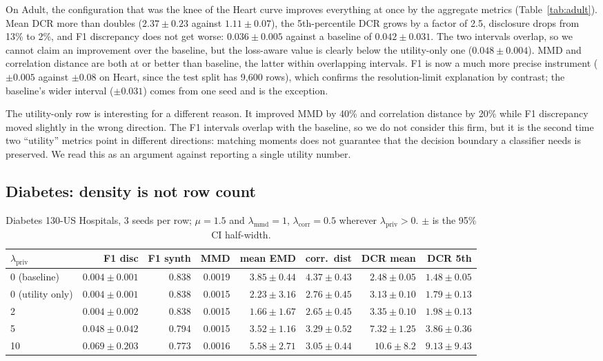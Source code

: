 \documentclass[11pt,a4paper]{article}
\newcommand{\lmmd}{\lambda_{\text{mmd}}}
\newcommand{\lcorr}{\lambda_{\text{corr}}}
\newcommand{\lpriv}{\lambda_{\text{priv}}}
\begin{document}
On Adult, the configuration that was the knee of the Heart curve improves
everything at once by the aggregate metrics (Table~\ref{tab:adult}). Mean DCR
more than doubles ($2.37 \pm 0.23$ against $1.11 \pm 0.07$), the
5th-percentile DCR grows by a factor of 2.5, disclosure drops from 13\% to
2\%, and F1 discrepancy does not get worse: $0.036 \pm 0.005$ against a
baseline of $0.042 \pm 0.031$. The two intervals overlap, so we cannot claim
an improvement over the baseline, but the loss-aware value is clearly below
the utility-only one ($0.048 \pm 0.004$). MMD and correlation distance are
both at or better than baseline, the latter within overlapping intervals. F1
is now a much more precise instrument ($\pm 0.005$ against $\pm 0.08$ on
Heart, since the test split has 9{,}600 rows), which confirms the
resolution-limit explanation by contrast; the baseline's wider interval
($\pm 0.031$) comes from one seed and is the exception.

The utility-only row is interesting for a different reason. It improved MMD by
40\% and correlation distance by 20\% while F1 discrepancy moved slightly in
the wrong direction. The F1 intervals overlap with the baseline, so we do not
consider this firm, but it is the second time two ``utility'' metrics point in
different directions: matching moments does not guarantee that the decision
boundary a classifier needs is preserved. We read this as an argument against
reporting a single utility number.

\subsection{Diabetes: density is not row count}
\label{sec:results:diabetes}

\begin{table}[htbp]
\caption{Diabetes 130-US Hospitals, 3 seeds per row; $\mu = 1.5$ and
$\lmmd = 1$, $\lcorr = 0.5$ wherever $\lpriv > 0$. $\pm$ is the 95\% CI
half-width.}
\label{tab:diabetes}
\centering\small
\begin{adjustbox}{max width=\textwidth}
\begin{tabular}{@{}lrrrrrrr@{}}
\toprule
$\lpriv$ & F1 disc & F1 synth & MMD & mean EMD & corr.\ dist & DCR mean & DCR 5th \\
\midrule
0 (baseline)     & $0.004 \pm 0.001$ & 0.838 & 0.0019 & $3.85 \pm 0.44$ & $4.37 \pm 0.43$ & $2.48 \pm 0.05$ & $1.48 \pm 0.05$ \\
0 (utility only) & $0.004 \pm 0.001$ & 0.838 & 0.0015 & $2.23 \pm 3.16$ & $2.76 \pm 0.45$ & $3.13 \pm 0.10$ & $1.79 \pm 0.13$ \\
2  & $0.004 \pm 0.002$ & 0.838 & 0.0015 & $\mathbf{1.66 \pm 1.67}$ & $\mathbf{2.65 \pm 0.45}$ & $3.35 \pm 0.10$ & $1.98 \pm 0.13$ \\
5  & $0.048 \pm 0.042$ & 0.794 & 0.0015 & $3.52 \pm 1.16$ & $3.29 \pm 0.52$ & $7.32 \pm 1.25$  & $3.86 \pm 0.36$ \\
10 & $0.069 \pm 0.203$ & 0.773 & 0.0016 & $5.58 \pm 2.71$ & $3.05 \pm 0.44$ & $10.6 \pm 8.2$  & $9.13 \pm 9.43$ \\
\bottomrule
\end{tabular}
\end{adjustbox}
\end{table}
\end{document}
